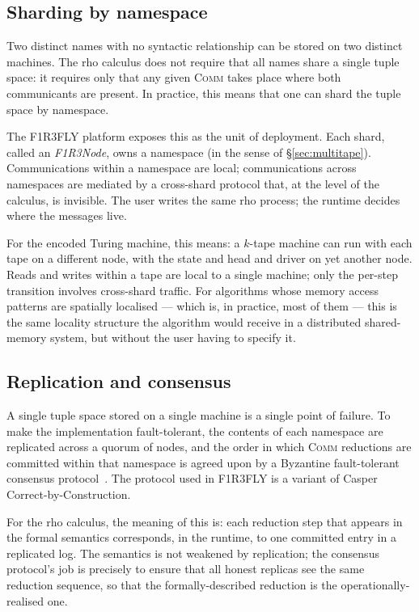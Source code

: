 \documentclass[11pt]{article}
\theoremstyle{plain}
\theoremstyle{definition}
\theoremstyle{remark}
\begin{document}
\subsection{Sharding by namespace}

Two distinct names with no syntactic relationship can be stored on two
distinct machines. The rho calculus does not require that all names
share a single tuple space: it requires only that any given \textsc{Comm}
takes place where both communicants are present. In practice, this means
that one can shard the tuple space by namespace.

The F1R3FLY platform exposes this as the unit of deployment. Each shard,
called an \emph{F1R3Node}, owns a namespace (in the sense of
\S\ref{sec:multitape}). Communications within a namespace are local;
communications across namespaces are mediated by a cross-shard protocol
that, at the level of the calculus, is invisible. The user writes the
same rho process; the runtime decides where the messages live.

For the encoded Turing machine, this means: a $k$-tape machine can run
with each tape on a different node, with the state and head and driver on
yet another node. Reads and writes within a tape are local to a single
machine; only the per-step transition involves cross-shard traffic. For
algorithms whose memory access patterns are spatially localised --- which
is, in practice, most of them --- this is the same locality structure the
algorithm would receive in a distributed shared-memory system, but
without the user having to specify it.

\subsection{Replication and consensus}

A single tuple space stored on a single machine is a single point of
failure. To make the implementation fault-tolerant, the contents of each
namespace are replicated across a quorum of nodes, and the order in
which \textsc{Comm} reductions are committed within that namespace is
agreed upon by a Byzantine fault-tolerant consensus
protocol~\cite{CasperCBC}. The protocol used in F1R3FLY is a variant of
Casper Correct-by-Construction.

For the rho calculus, the meaning of this is: each reduction step that
appears in the formal semantics corresponds, in the runtime, to one
committed entry in a replicated log. The semantics is not weakened by
replication; the consensus protocol's job is precisely to ensure that
all honest replicas see the same reduction sequence, so that the
formally-described reduction is the operationally-realised one.
\end{document}
